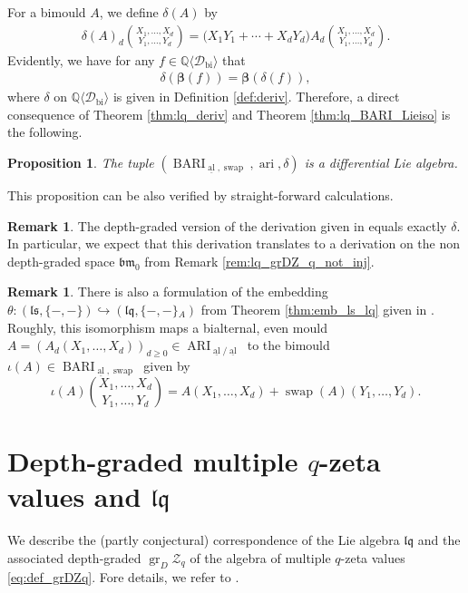 \documentclass[12pt,reqno]{amsart}
\newtheorem{prop}[thm]{Proposition}
\numberwithin{equation}{section}
\theoremstyle{definition}
\newtheorem{rem}[thm]{Remark}
\newcommand{\QQ}{\mathbb{Q}}
\newcommand{\Z}{\mathcal{Z}}
\newcommand{\grDZ}{\operatorname{gr}_D\Z}
\newcommand{\BARI}{\operatorname{BARI}_{\underline{\operatorname{al}},\operatorname{swap}}}
\newcommand{\bimap}{\boldsymbol{\beta}}
\newcommand{\Dbi}{\mathcal{D}_{\operatorname{bi}}}
\newcommand{\QDbi}{\QQ\langle \Dbi\rangle}
\newcommand{\ls}{\mathfrak{ls}}
\newcommand{\lqq}{\mathfrak{lq}}
\newcommand{\bmzero}{\mathfrak{bm}_0}
\newcommand{\ariemp}{\{-,-\}\!_A}
\begin{document}
\vspace{0.3cm}
For a bimould $A$, we define $\delta(A)$ by
\begin{align*}
\delta(A)_d\binom{X_1,\ldots,X_d}{Y_1,\ldots,Y_d}=\big(X_1Y_1+\cdots+X_dY_d\big)A_d\binom{X_1,\ldots,X_d}{Y_1,\ldots,Y_d}.
\end{align*}
Evidently, we have for any $f\in \QDbi$ that
\begin{align*}
\delta(\bimap(f))=\bimap(\delta(f)),
\end{align*}
where $\delta$ on $\QDbi$ is given in Definition \ref{def:deriv}. Therefore, a direct consequence of Theorem \ref{thm:lq_deriv} and Theorem \ref{thm:lq_BARI_Lieiso} is the following.
\begin{prop} The tuple $(\BARI,\operatorname{ari},\delta)$ is a differential Lie algebra.
\end{prop}
This proposition can be also verified by straight-forward calculations. 
\begin{rem} The depth-graded version of the derivation given in \cite[Definition 4.10]{BI24} equals exactly $\delta$. In particular, we expect that this derivation translates to a derivation on the non depth-graded space $\bmzero$ from Remark \ref{rem:lq_grDZ_q_not_inj}.
\end{rem}
\begin{rem} There is also a formulation of the embedding $\theta:(\ls,\{-,-\})\hookrightarrow(\lqq,\ariemp)$ from Theorem \ref{thm:emb_ls_lq} given in \cite{Kü19}. Roughly, this isomorphism maps a bialternal, even mould $A=(A_d(X_1,\ldots,X_d))_{d\geq0}\in \operatorname{ARI}_{\underline{\operatorname{al}}/\underline{\operatorname{al}}}$ to the bimould $\iota(A)\in\BARI$ given by
\[\iota(A)\binom{X_1,\ldots,X_d}{Y_1,\ldots,Y_d}=A(X_1,\ldots,X_d)+\operatorname{swap}(A)(Y_1,\ldots,Y_d).\]
\end{rem}

\iffalse
\section{Depth-graded multiple $q$-zeta values and $\lqq$} \label{sec:grDZq_and_lq}

We describe the (partly conjectural) correspondence of the Lie algebra $\lqq$ and the associated depth-graded $\grDZ_q$ of the algebra of multiple $q$-zeta values \eqref{eq:def_grDZq}. Fore details, we refer to \cite{Bu23}.
\end{document}
